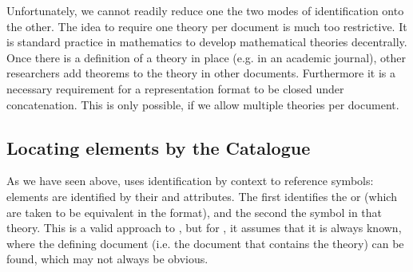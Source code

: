 Unfortunately, we cannot readily reduce one the two modes of identification onto
the other. The idea to require one theory per document is much too restrictive. It
is standard practice in mathematics to develop mathematical theories decentrally.
Once there is a definition of a theory in place (e.g. in an academic journal),
other researchers add theorems to the theory in other documents. Furthermore it is
a necessary requirement for a representation format to be closed under
concatenation. This is only possible, if we allow multiple theories per document.
 
\subsection{Locating {\fi} elements by the {\else{\omdoc}\fi} Catalogue}

As we have seen above, {\openmath} uses identification by context to reference
symbols: {} elements are identified by their {}
and {} attributes. The first identifies the
{} or {\openmath} {} (which are
taken to be equivalent in the {\omdoc} format), and the second the symbol in that
theory.  This is a valid approach to {}, but for
{}, it assumes that it is always known, where the defining
document (i.e.  the {\omdoc} document that contains the theory) can be found,
which may not always be obvious.

